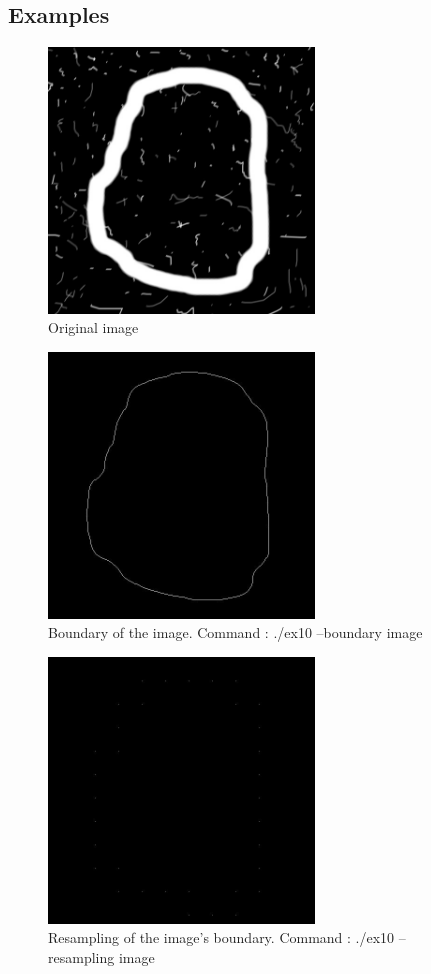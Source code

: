 \documentclass[10pt]{article}
\begin{document}
\subsection{Examples}
\begin{figure}[!ht]
	\centering
	\includegraphics[height=200pt]{./ex10/noisy_stroke.jpg}
	\caption{Original image}
\end{figure}
\begin{figure}[!ht]
	\centering
	\includegraphics[height=200pt]{./ex10/noisy_boundary.jpg}
	\caption{Boundary of the image. Command : ./ex10 --boundary image}
\end{figure}
\begin{figure}[!ht]
	\centering
	\includegraphics[height=200pt]{./ex10/noisy_resample.jpg}
	\caption{Resampling of the image's boundary. Command : ./ex10 --resampling image}
\end{figure}
\end{document}

